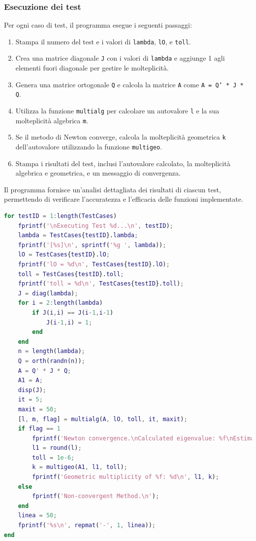 \documentclass[12pt]{article}
\begin{document}
\subsubsection{Esecuzione dei test}
Per ogni caso di test, il programma esegue i seguenti passaggi:
    \begin{enumerate}
        \item Stampa il numero del test e i valori di \texttt{lambda}, \texttt{lO}, e \texttt{toll}.
        \item Crea una matrice diagonale \texttt{J} con i valori di \texttt{lambda} e aggiunge 1 agli elementi fuori diagonale per gestire le molteplicità.
        \item Genera una matrice ortogonale \texttt{Q} e calcola la matrice \texttt{A} come \texttt{A = Q' * J * Q}.
        \item Utilizza la funzione \texttt{multialg} per calcolare un autovalore \texttt{l} e la sua molteplicità algebrica \texttt{m}.
        \item Se il metodo di Newton converge, calcola la molteplicità geometrica \texttt{k} dell'autovalore utilizzando la funzione \texttt{multigeo}.
        \item Stampa i risultati del test, inclusi l'autovalore calcolato, la molteplicità algebrica e geometrica, e un messaggio di convergenza.
    \end{enumerate}
    Il programma fornisce un'analisi dettagliata dei risultati di ciascun test, permettendo di verificare l'accuratezza e l'efficacia delle funzioni implementate.
    \newpage
\begin{lstlisting}[language=Matlab, frame=single, caption={Esecuzione dei test}, captionpos=b]
for testID = 1:length(TestCases)
    fprintf('\nExecuting Test %d...\n', testID);    
    lambda = TestCases{testID}.lambda;
    fprintf('[%s]\n', sprintf('%g ', lambda));
    lO = TestCases{testID}.lO;
    fprintf('lO = %d\n', TestCases{testID}.lO);
    toll = TestCases{testID}.toll;
    fprintf('toll = %d\n', TestCases{testID}.toll);
    J = diag(lambda);
    for i = 2:length(lambda)
        if J(i,i) == J(i-1,i-1)
            J(i-1,i) = 1;
        end
    end
    n = length(lambda);
    Q = orth(randn(n)); 
    A = Q' * J * Q;
    A1 = A;
    disp(J);     
    it = 5;
    maxit = 50;
    [l, m, flag] = multialg(A, lO, toll, it, maxit);
    if flag == 1
        fprintf('Newton convergence.\nCalculated eigenvalue: %f\nEstimated algebraic multiplicity: %d\n', l, m);
        l1 = round(l);
        toll = 1e-6;
        k = multigeo(A1, l1, toll);
        fprintf('Geometric multiplicity of %f: %d\n', l1, k);
    else
        fprintf('Non-convergent Method.\n');
    end
    linea = 50;
    fprintf('%s\n', repmat('-', 1, linea));
end
\end{lstlisting}
\newpage
\end{document}
